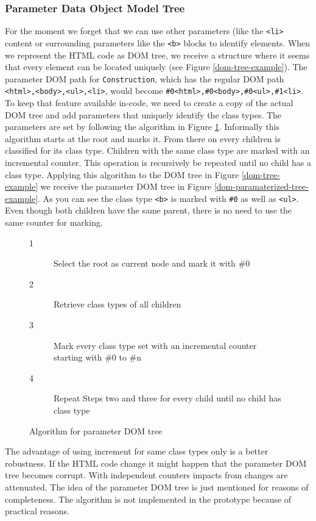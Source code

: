 \subsubsection{Parameter Data Object Model Tree}\label{param-dom-tree}

For the moment we forget that we can use other parameters (like the \verb^<li>^ content or surrounding parameters like the \verb^<b>^ blocks to identify elements. 
When we represent the HTML code as DOM tree, we receive a structure where it seems that every element can be located uniquely (see Figure \ref{dom-tree-example}). The parameter DOM path for \verb^Construction^, which has the regular DOM path \verb^<html>,<body>,<ul>,<li>^, would become \verb^#0<html>,#0<body>,#0<ul>,#1<li>^. 
To keep that feature available in-code, we need to create a copy of the actual DOM tree and add parameters that uniquely identify the class types. 
The parameters are set by following the algorithm in Figure \ref{alg-param-dom-tree}. Informally this algorithm starts at the root and marks it. From there on every children is classified for its class type. Children with the same class type are marked with an incremental counter. This operation is recursively be repeated until no child has a class type. 
Applying this algorithm to the DOM tree in Figure \ref{dom-tree-example} we receive the parameter DOM tree in Figure \ref{dom-paramaterized-tree-example}. As you can see the class type \verb^<b>^ is marked with \verb^#0^ as well as \verb^<ul>^. Even though both children have the same parent, there is no need to use the same counter for marking.

\begin{figure}
\begin{description}
	\item[1] Select the root as current node and mark it with \#0
	\item[2] Retrieve class types of all children
	\item[3] Mark every class type set with an incremental counter starting with \#0 to \#n
	\item[4] Repeat Steps two and three for every child until no child has class type
\end{description}
\caption{Algorithm for parameter DOM tree}
\label{alg-param-dom-tree}
\end{figure}

The advantage of using increment for same class types only is a better robustness. If the HTML code change it might happen that the parameter DOM tree becomes corrupt. With independent counters impacts from changes are attenuated. 
The idea of the parameter DOM tree is just mentioned for reasons of completeness. The algorithm is not implemented in the prototype because of practical reasons. 

